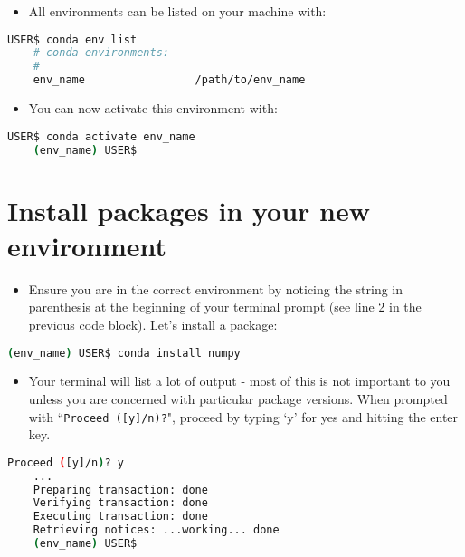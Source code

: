 \documentclass[10pt]{article}
\begin{document}
\begin{itemize}
	\item All environments can be listed on your machine with:
\end{itemize}

\begin{lstlisting}[language=bash]
	USER$ conda env list
	# conda environments:
	#
	env_name                 /path/to/env_name
\end{lstlisting}

\begin{itemize}
	\item You can now activate this environment with:
\end{itemize}


\begin{lstlisting}[language=bash]
	USER$ conda activate env_name
	(env_name) USER$ 
\end{lstlisting}

\section{Install packages in your new environment}

\begin{itemize}
	\item Ensure you are in the correct environment by noticing the string in parenthesis at the beginning of your terminal prompt (see line 2 in the previous code block). Let's install a package:
\end{itemize}

	\begin{lstlisting}[language=bash]
	(env_name) USER$ conda install numpy
\end{lstlisting}

\begin{itemize}
	\item Your terminal will list a lot of output - most of this is not important to you unless you are concerned with particular package versions. When prompted with ``\lstinline|Proceed ([y]/n)?|", proceed by typing `y' for yes and hitting the enter key.
\end{itemize}

\begin{lstlisting}[language=bash]
	Proceed ([y]/n)? y
	...
	Preparing transaction: done
	Verifying transaction: done
	Executing transaction: done
	Retrieving notices: ...working... done
	(env_name) USER$ 
\end{lstlisting}
\end{document}
